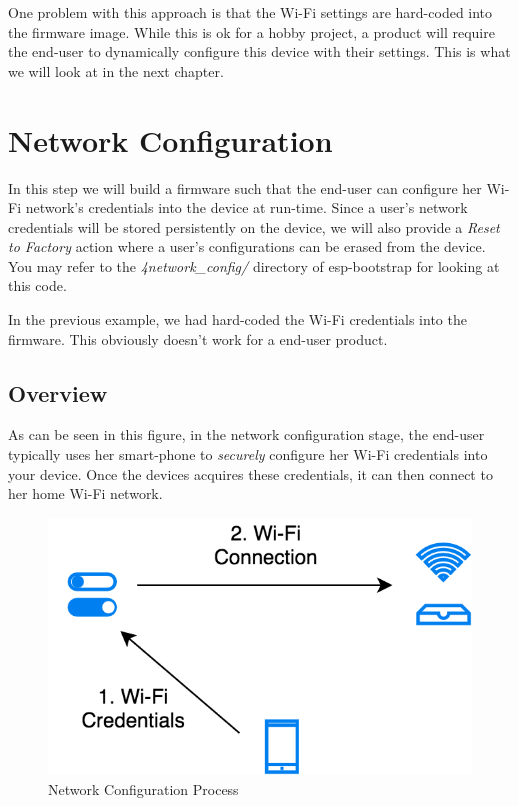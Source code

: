 \documentclass[11pt,fleqn]{book} %
\begin{document}
One problem with this approach is that the Wi-Fi settings are hard-coded into the firmware image. While this is ok for a hobby project, a product will require the end-user to dynamically configure this device with their settings. This is what we will look at in the next chapter.



\chapter{Network Configuration}

In this step we will build a firmware such that the end-user can configure her Wi-Fi network's credentials into the device at run-time. Since a user's network credentials will be stored persistently on the device, we will also provide a \textit{Reset to Factory} action where a user's configurations can be erased from the device.
You may refer to the \textit{4network\_config/} directory of esp-bootstrap for looking at this code.

In the previous example, we had hard-coded the Wi-Fi credentials into the firmware. This obviously doesn't work for a end-user product.

\section{Overview}
As can be seen in this figure, in the network configuration stage, the end-user typically uses her smart-phone to \textit{securely} configure her Wi-Fi credentials into your device. Once the devices acquires these credentials, it can then connect to her home Wi-Fi network. 

\begin{figure}
    \centering
    \includegraphics[scale=0.4]{Pictures/network_config.png}
    \caption{Network Configuration Process}
    \label{fig:network_config}
\end{figure}
\end{document}
